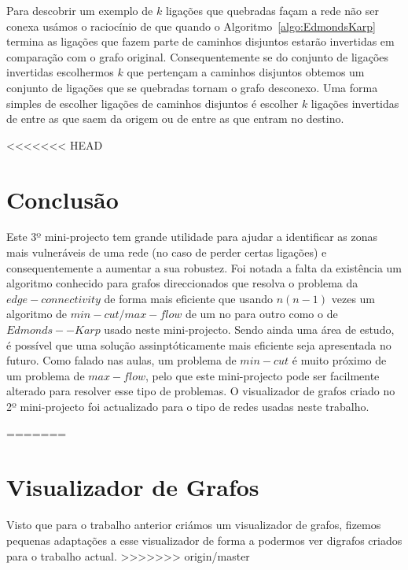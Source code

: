 \documentclass[10pt,a4paper]{article}
\begin{document}
Para descobrir um exemplo de $k$ ligações que quebradas façam a rede não ser conexa usámos o raciocínio de que quando o Algoritmo~\ref{algo:EdmondsKarp} termina as ligações que fazem parte de caminhos disjuntos estarão invertidas em comparação com o grafo original. Consequentemente se do conjunto de ligações invertidas escolhermos $k$ que pertençam a caminhos disjuntos obtemos um conjunto de ligações que se quebradas tornam o grafo desconexo. Uma forma simples de escolher ligações de caminhos disjuntos é escolher $k$ ligações invertidas de entre as que saem da origem ou de entre as que entram no destino.

<<<<<<< HEAD
\section{Conclusão}
Este 3º mini-projecto tem grande utilidade para ajudar a identificar as zonas mais vulneráveis de uma rede (no caso de perder certas ligações) e consequentemente a aumentar a sua robustez. Foi notada a falta da existência um algoritmo conhecido para grafos direccionados que resolva o problema da $edge-connectivity$ de forma mais eficiente que usando $n(n-1)$ vezes um algoritmo de $min-cut/max-flow$  de um no para outro como o de $Edmonds--Karp$ usado neste mini-projecto. Sendo ainda uma área de estudo, é possível que uma solução assinptóticamente mais eficiente seja apresentada no futuro.  Como falado nas aulas, um problema de $min-cut$ é muito próximo de um problema de $max-flow$, pelo que este mini-projecto pode ser facilmente alterado para resolver esse tipo de problemas. O visualizador de grafos criado no 2º mini-projecto foi actualizado para o tipo de redes usadas neste trabalho.


=======
\section{Visualizador de Grafos}
Visto que para o trabalho anterior criámos um visualizador de grafos, fizemos pequenas adaptações a esse visualizador de forma a podermos ver digrafos criados para o trabalho actual.
>>>>>>> origin/master


\nocite{slidesADRC}
\end{document}
